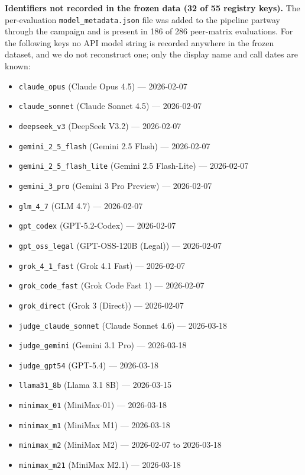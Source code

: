 \noindent\textbf{Identifiers not recorded in the frozen data (32 of 55 registry keys).} The per-evaluation \texttt{model\_metadata.json} file was added to the pipeline partway through the campaign and is present in 186 of 286 peer-matrix evaluations. For the following keys no API model string is recorded anywhere in the frozen dataset, and we do not reconstruct one; only the display name and call dates are known:

\begin{small}\begin{itemize}\setlength\itemsep{0pt}
  \item \texttt{claude\_opus} (Claude Opus 4.5) --- 2026-02-07
  \item \texttt{claude\_sonnet} (Claude Sonnet 4.5) --- 2026-02-07
  \item \texttt{deepseek\_v3} (DeepSeek V3.2) --- 2026-02-07
  \item \texttt{gemini\_2\_5\_flash} (Gemini 2.5 Flash) --- 2026-02-07
  \item \texttt{gemini\_2\_5\_flash\_lite} (Gemini 2.5 Flash-Lite) --- 2026-02-07
  \item \texttt{gemini\_3\_pro} (Gemini 3 Pro Preview) --- 2026-02-07
  \item \texttt{glm\_4\_7} (GLM 4.7) --- 2026-02-07
  \item \texttt{gpt\_codex} (GPT-5.2-Codex) --- 2026-02-07
  \item \texttt{gpt\_oss\_legal} (GPT-OSS-120B (Legal)) --- 2026-02-07
  \item \texttt{grok\_4\_1\_fast} (Grok 4.1 Fast) --- 2026-02-07
  \item \texttt{grok\_code\_fast} (Grok Code Fast 1) --- 2026-02-07
  \item \texttt{grok\_direct} (Grok 3 (Direct)) --- 2026-02-07
  \item \texttt{judge\_claude\_sonnet} (Claude Sonnet 4.6) --- 2026-03-18
  \item \texttt{judge\_gemini} (Gemini 3.1 Pro) --- 2026-03-18
  \item \texttt{judge\_gpt54} (GPT-5.4) --- 2026-03-18
  \item \texttt{llama31\_8b} (Llama 3.1 8B) --- 2026-03-15
  \item \texttt{minimax\_01} (MiniMax-01) --- 2026-03-18
  \item \texttt{minimax\_m1} (MiniMax M1) --- 2026-03-18
  \item \texttt{minimax\_m2} (MiniMax M2) --- 2026-02-07 to 2026-03-18
  \item \texttt{minimax\_m21} (MiniMax M2.1) --- 2026-03-18

\end{itemize}
\end{small}
